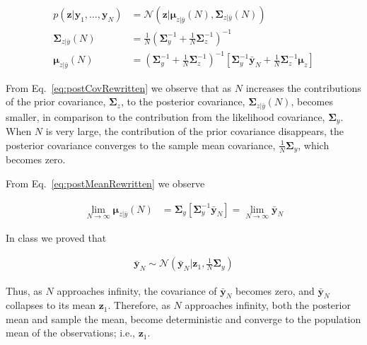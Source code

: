 \documentclass[12pt]{article}
\begin{document}
\begin{align}
    p(\mathbf{z}|\mathbf{y}_1,\ldots,\mathbf{y}_N)&=\mathcal{N}(\mathbf{z}|\boldsymbol{\mu}_{z|\bar{y}}(N),\boldsymbol{\Sigma}_{z|\bar{y}}(N))\nonumber\\
    \boldsymbol{\Sigma}_{z|\bar{y}}(N)&=\frac{1}{N}\left(\boldsymbol{\Sigma}_y^{-1}+\frac{1}{N}\boldsymbol{\Sigma}_z^{-1}\right)^{-1}\label{eq:postCovRewritten}\\
    \boldsymbol{\mu}_{z|\bar{y}}(N)&=\left(\boldsymbol{\Sigma}_y^{-1}+\frac{1}{N}\boldsymbol{\Sigma}_z^{-1}\right)^{-1}\left[\boldsymbol{\Sigma}_y^{-1}\bar{\mathbf{y}}_N+\frac{1}{N}\boldsymbol{\Sigma}_z^{-1}\boldsymbol{\mu}_z\right]\label{eq:postMeanRewritten}
\end{align}

From Eq.~\ref{eq:postCovRewritten} we observe that as $N$ increases the
contributions of the prior covariance, $\boldsymbol{\Sigma}_z$, to the posterior covariance,
$\boldsymbol{\Sigma}_{z|\bar{y}}(N)$, becomes smaller, in comparison to the contribution
from the likelihood covariance, $\boldsymbol{\Sigma}_y$. When $N$ is very large, the
contribution of the prior covariance disappears, the posterior covariance
converges to the sample mean covariance, $\frac{1}{N}\boldsymbol{\Sigma}_y$, which becomes
zero.

From Eq.~\ref{eq:postMeanRewritten} we observe 

\begin{align*}
    \lim_{N\rightarrow\infty}\boldsymbol{\mu}_{z|\bar{y}}(N)&=\boldsymbol{\Sigma}_y\left[\boldsymbol{\Sigma}_y^{-1}\bar{\mathbf{y}}_N\right]=\lim_{N\rightarrow\infty}\bar{\mathbf{y}}_N
\end{align*}

In class we proved that

\begin{align}
    \bar{\mathbf{y}}_N\sim\mathcal{N}(\bar{\mathbf{y}}_N|\mathbf{z}_1,\frac{1}{N}\boldsymbol{\Sigma}_y)\nonumber
\end{align}

\noindent Thus, as $N$ approaches infinity, the covariance of
$\bar{\mathbf{y}}_N$ becomes zero, and $\bar{\mathbf{y}}_N$ collapses to its
mean $\mathbf{z}_1$.  Therefore, as $N$ approaches infinity, both the posterior
mean and sample the mean, become deterministic and converge to the population
mean of the observations; i.e., $\mathbf{z}_1$.



\end{document}
